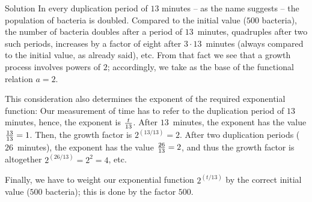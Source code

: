 \begin{MContent}
\begin{MExercise}
  \begin{MHint}{Solution}
  In every duplication period of $13$ minutes -- as the name suggests -- the population of bacteria is doubled.
  Compared to the initial value ($500$ bacteria), the number of bacteria doubles after a period of $13$~minutes, 
  quadruples after two such periods, increases by a factor of eight after $3 \cdot 13$~minutes (always compared
  to the initial value, as already said), etc. From that fact we see that a growth process involves powers 
  of $2$; accordingly, we take as the base of the functional relation $a = 2$. 

  This consideration also determines the exponent of the required exponential function: Our measurement 
  of time has to refer to the duplication period of $13$ minutes, hence, the exponent is $\tfrac{t}{13}$. 
  After $13$~minutes, the exponent has the value $\tfrac{13}{13} = 1$. Then, the growth factor is 
  $2^{(13/13)}=2$. After two duplication periods ($26$~minutes), the exponent has the value $\tfrac{26}{13} = 2$, 
  and thus the growth factor is altogether $2^{(26/13)} = 2^2 = 4$, etc. 

  Finally, we have to weight our exponential function $2^{(t/13)}$ by the correct initial value 
  ($500$ bacteria); this is done by the factor $500$.
 \end{MHint}
\end{MExercise}
\end{MContent}

